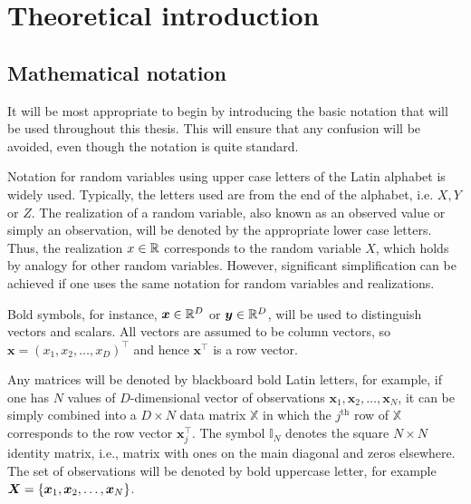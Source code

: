 \chapter{Theoretical introduction}

\section{Mathematical notation}\label{sec:terminology}
It will be most appropriate to begin by introducing the basic notation that will be used throughout this thesis. This will ensure that any confusion will be avoided, even though the notation is quite standard. 

Notation for random variables using upper case letters of the Latin alphabet is widely used. Typically, the letters used are from the end of the alphabet, i.e. $X,Y$ or $Z$. The realization of a random variable, also known as an observed value or simply an observation, will be denoted by the appropriate lower case letters. Thus, the realization  $x \in \mathbb{R}$ corresponds to the random variable $X$, which holds by analogy for other random variables. However, significant simplification can be achieved if one uses the same notation for random variables and realizations.  

Bold symbols, for instance, $\boldsymbol{x}\in \mathbb{R}^D$ or $\boldsymbol{y} \in \mathbb{R}^D$, will be used to distinguish vectors and scalars. All vectors are assumed to be column vectors, so $\boldsymbol{x} = \left(x_1,x_2,\dots,x_D\right)^\top$ and hence $\boldsymbol{x}^\top$ is a row vector. 

Any matrices will be denoted by blackboard bold Latin letters, for example, if one has $N$ values of $D$-dimensional vector of observations $\boldsymbol{x}_1,\boldsymbol{x}_2,\dots,\boldsymbol{x}_N$, it can be simply combined into a $D \times N$ data matrix $\mathbb{X}$ in which the $j^{\mathrm{th}}$ row of $\mathbb{X}$ corresponds to the row vector $\boldsymbol{x}_j^\top$. The symbol $\mathbb{I}_N$ denotes the square $N \times N$ identity matrix, i.e., matrix with ones on the main diagonal and zeros elsewhere. The set of observations will be denoted by bold uppercase letter, for example $\boldsymbol{X} = \left\lbrace \boldsymbol{x}_1,\boldsymbol{x}_2,\dots,\boldsymbol{x}_N \right\rbrace $.



